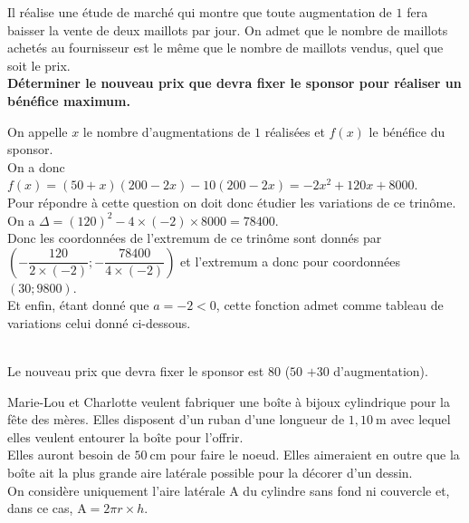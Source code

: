 \documentclass[12pt,a4paper]{article}  %
\begin{document}
Il réalise une étude de marché qui montre que toute augmentation de $1$ \EUR{} fera baisser la vente de deux maillots par jour. On admet que le nombre de maillots achetés au fournisseur est le même que le nombre de maillots vendus, quel que soit le prix.\\

\textbf{Déterminer le nouveau prix que devra fixer le sponsor pour réaliser un bénéfice maximum.}

\begin{corrBox}
    On appelle $x$ le nombre d'augmentations de $1$\EUR{} réalisées et $f(x)$ le bénéfice du sponsor.\\
    On a donc $f(x)=(50+x)(200-2 x)-10(200-2 x)=-2 x^{2}+120 x+8000$. \\
    Pour répondre à cette question on doit donc étudier les variations de ce trinôme.\\
    On a $\Delta=(120)^{2}-4 \times(-2) \times 8000=78400$.\\
    Donc les coordonnées de l'extremum de ce trinôme sont donnés par $\left(-\dfrac{120}{2 \times(-2)} ;-\dfrac{78400}{4 \times(-2)}\right)$ et l'extremum a donc pour coordonnées $(30 ; 9800)$. \\
    Et enfin, étant donné que $a=-2<0$, cette fonction admet comme tableau de variations celui donné ci-dessous.\\
    \\
    Le nouveau prix que devra fixer le sponsor est $80$\EUR{} ($50$\EUR{} $+30$ \EUR{} d'augmentation).
\end{corrBox}

Marie-Lou et Charlotte veulent fabriquer une boîte à bijoux cylindrique pour la fête des mères. Elles disposent d'un ruban d'une longueur de $1,10 \mathrm{~m}$ avec lequel elles veulent entourer la boîte pour l'offrir.\\

Elles auront besoin de $50 \mathrm{~cm}$ pour faire le noeud. Elles aimeraient en outre que la boîte ait la plus grande aire latérale possible pour la décorer d'un dessin.\\
On considère uniquement l'aire latérale A du cylindre sans fond ni couvercle et, dans ce cas, $\mathrm{A}=2 \pi r \times h$.\\
\end{document}

